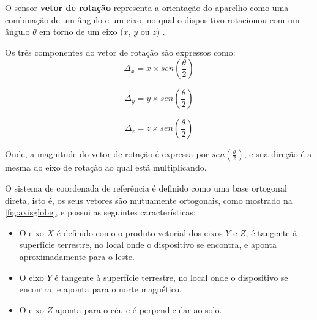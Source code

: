 O sensor \textbf{vetor de rotação} representa a orientação do aparelho como uma combinação de um ângulo e um eixo, no qual o dispositivo rotacionou com um ângulo $\theta$ em torno de um eixo ($x$, $y$ ou $z$) . \par
Os três componentes do vetor de rotação são expressos como:\\

\begin{equation}
\Delta_x = x \times sen(\frac{\theta}{2})
\label{eq:vec_rot_x}
\end{equation}

\begin{equation}
\Delta_y = y \times sen(\frac{\theta}{2})
\label{eq:vec_rot_y}
\end{equation}

\begin{equation}
\Delta_z = z \times sen(\frac{\theta}{2})
\label{eq:vec_rot_z}
\end{equation}

Onde, a magnitude do vetor de rotação é expressa por $sen(\frac{\theta}{2})$, e sua direção é a mesma do eixo de rotação ao qual está multiplicando.\par

O sistema de coordenada de referência é definido como uma base ortogonal direta, isto é, os seus vetores são mutuamente ortogonais, como mostrado na \autoref{fig:axisglobe}, e possui as seguintes características:\par
\begin{itemize}
\item O eixo $X$ é definido como o produto vetorial dos eixos $Y$ e $Z$, é tangente à superfície terrestre, no local onde o dispositivo se encontra, e aponta aproximadamente para o leste.\par

\item O eixo $Y$ é tangente à superfície terrestre, no local onde o dispositivo se encontra, e aponta para o norte magnético. \par

\item O eixo $Z$ aponta para o céu e é perpendicular ao solo.
\end{itemize}